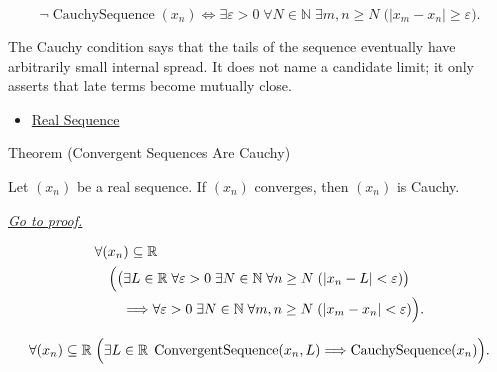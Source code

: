 \begin{remark*}
\[
\neg\operatorname{CauchySequence}(x_n)
\Longleftrightarrow
\exists \varepsilon>0 \;\forall N\in\mathbb{N}\;\exists m,n\ge N
\;\bigl(|x_m-x_n|\ge\varepsilon\bigr).
\]
\end{remark*}

\begin{remark*}[Interpretation]
The Cauchy condition says that the tails of the sequence eventually have
arbitrarily small internal spread. It does not name a candidate limit; it
only asserts that late terms become mutually close.
\end{remark*}

\begin{dependencies}
\begin{itemize}
  \item \hyperref[def:real-sequence]{Real Sequence}
\end{itemize}
\end{dependencies}


\begin{theorembox}{Theorem (Convergent Sequences Are Cauchy)}
\begin{theorem}
\label{thm:convergent-sequences-are-cauchy}
Let $(x_n)$ be a real sequence. If $(x_n)$ converges, then $(x_n)$ is
Cauchy.

\smallskip
\noindent
\hyperref[prf:convergent-sequences-are-cauchy]{\textit{Go to proof.}}
\end{theorem}
\end{theorembox}

\begin{remark*}
\[
\begin{aligned}
&\forall (x_n)\subseteq\mathbb{R}\\
&\quad
\Bigl(
  \bigl(\exists L\in\mathbb{R}\;\forall \varepsilon>0\;\exists N\in\mathbb{N}
  \;\forall n\ge N\;( |x_n-L|<\varepsilon )\bigr)\\
&\qquad\Longrightarrow
  \forall \varepsilon>0\;\exists N\in\mathbb{N}\;\forall m,n\ge N
  \;( |x_m-x_n|<\varepsilon )
\Bigr).
\end{aligned}
\]
\end{remark*}

\begin{remark*}
\[
\forall (x_n)\subseteq\mathbb{R}\;
\Bigl(
  \exists L\in\mathbb{R}\;\operatorname{ConvergentSequence}(x_n,L)
  \Longrightarrow
  \operatorname{CauchySequence}(x_n)
\Bigr).
\]
\end{remark*}

